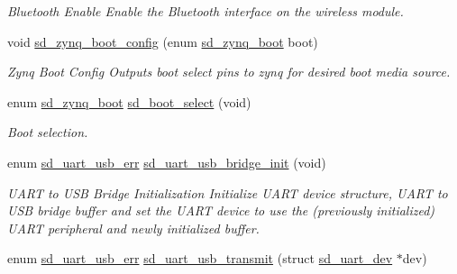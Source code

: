 \begin{DoxyCompactItemize}
\begin{DoxyCompactList}\small\item\em Bluetooth Enable Enable the Bluetooth interface on the wireless module. \end{DoxyCompactList}\item 
void \mbox{\hyperlink{group___s_d___platform___function___declarations_ga759f86160fc8d270309fc2a74e4139e3}{sd\+\_\+zynq\+\_\+boot\+\_\+config}} (enum \mbox{\hyperlink{group___s_d___platform_ga06667de95c86bfcdef8bcc8ab13cb2d4}{sd\+\_\+zynq\+\_\+boot}} boot)
\begin{DoxyCompactList}\small\item\em Zynq Boot Config Outputs boot select pins to zynq for desired boot media source. \end{DoxyCompactList}\item 
\mbox{\label{group___s_d___platform___function___declarations_ga28381c9d642f66d9a6968ff7406a63d4}} 
enum \mbox{\hyperlink{group___s_d___platform_ga06667de95c86bfcdef8bcc8ab13cb2d4}{sd\+\_\+zynq\+\_\+boot}} \mbox{\hyperlink{group___s_d___platform___function___declarations_ga28381c9d642f66d9a6968ff7406a63d4}{sd\+\_\+boot\+\_\+select}} (void)
\begin{DoxyCompactList}\small\item\em Boot selection. \end{DoxyCompactList}\item 
enum \mbox{\hyperlink{group___s_d___u_a_r_t___u_s_b___bridge___types_ga7e4773a8cce69fafe541cad55985f146}{sd\+\_\+uart\+\_\+usb\+\_\+err}} \mbox{\hyperlink{group___s_d___platform___function___declarations_gaa03f4625c66a0fe3be62a6aead8ac2ba}{sd\+\_\+uart\+\_\+usb\+\_\+bridge\+\_\+init}} (void)
\begin{DoxyCompactList}\small\item\em U\+A\+RT to U\+SB Bridge Initialization Initialize U\+A\+RT device structure, U\+A\+RT to U\+SB bridge buffer and set the U\+A\+RT device to use the (previously initialized) U\+A\+RT peripheral and newly initialized buffer. \end{DoxyCompactList}\item 
enum \mbox{\hyperlink{group___s_d___u_a_r_t___u_s_b___bridge___types_ga7e4773a8cce69fafe541cad55985f146}{sd\+\_\+uart\+\_\+usb\+\_\+err}} \mbox{\hyperlink{group___s_d___platform___function___declarations_ga7277fee3051720471dd68980c4928cbc}{sd\+\_\+uart\+\_\+usb\+\_\+transmit}} (struct \mbox{\hyperlink{structsd__uart__dev}{sd\+\_\+uart\+\_\+dev}} $\ast$dev)

\end{DoxyCompactItemize}
